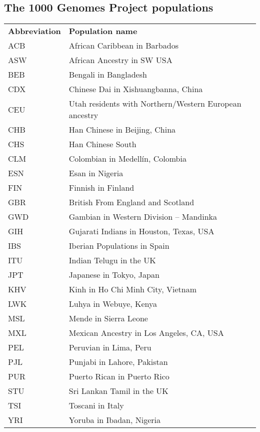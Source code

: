 \newpage
\subsection*{The 1000 Genomes Project populations}

\begin{table}[!h]
\hspace{1.0cm}
\begin{tabular}{l l r}

\textbf{Abbreviation} & \textbf{Population name}\\ [1ex]
\textsc{ACB} & African Caribbean in Barbados\\ [1ex]
\textsc{ASW} & African Ancestry in SW USA \\ [1ex]
\textsc{BEB} & Bengali in Bangladesh\\ [1ex]
\textsc{CDX} & Chinese Dai in Xishuangbanna, China\\ [1ex]
\textsc{CEU} & Utah residents with Northern/Western European ancestry\\ [1ex]
\textsc{CHB} & Han Chinese in Beijing, China\\ [1ex]
\textsc{CHS} & Han Chinese South\\ [1ex]
\textsc{CLM} & Colombian in Medell\'{i}n, Colombia\\ [1ex]
\textsc{ESN} & Esan in Nigeria\\ [1ex]
\textsc{FIN} & Finnish in Finland\\ [1ex]
\textsc{GBR} & British From England and Scotland\\ [1ex]
\textsc{GWD} & Gambian in Western Division -- Mandinka\\ [1ex]
\textsc{GIH} & Gujarati Indians in Houston, Texas, USA\\ [1ex]
\textsc{IBS} & Iberian Populations in Spain\\ [1ex]
\textsc{ITU} & Indian Telugu in the UK\\ [1ex]
\textsc{JPT} & Japanese in Tokyo, Japan\\ [1ex]
\textsc{KHV} & Kinh in Ho Chi Minh City, Vietnam\\ [1ex]
\textsc{LWK} & Luhya in Webuye, Kenya\\ [1ex]
\textsc{MSL} & Mende in Sierra Leone\\ [1ex]
\textsc{MXL} & Mexican Ancestry in Los Angeles, CA, USA\\ [1ex]
\textsc{PEL} & Peruvian in Lima, Peru\\ [1ex]
\textsc{PJL} & Punjabi in Lahore, Pakistan\\ [1ex]
\textsc{PUR} & Puerto Rican in Puerto Rico\\ [1ex]
\textsc{STU} & Sri Lankan Tamil in the UK\\ [1ex]
\textsc{TSI} & Toscani in Italy\\ [1ex]
\textsc{YRI} & Yoruba in Ibadan, Nigeria\\ [1ex]

\end{tabular}
\end{table}

\normalsize






